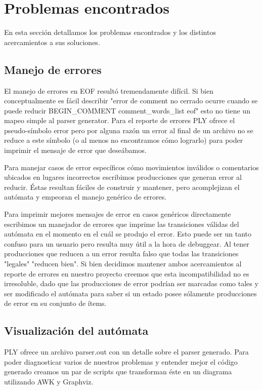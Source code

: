 \section{Problemas encontrados}
En esta sección detallamos los problemas encontrados y los distintos acercamientos a sus soluciones.

\subsection{Manejo de errores}
El manejo de errores en EOF resultó tremendamente difícil. Si bien conceptualmente es fácil describir "error de comment no cerrado ocurre cuando se puede reducir BEGIN\_COMMENT comment\_words\_list eof" esto no tiene un mapeo simple al parser generator. Para el reporte de errores PLY ofrece el pseudo-símbolo error pero por alguna razón un error al final de un archivo no se reduce a este símbolo (o al menos no encontramos cómo lograrlo) para poder imprimir el mensaje de error que deseábamos.

Para manejar casos de error específicos cómo movimientos inválidos o comentarios ubicados en lugares incorrectos escribimos producciones que generan error al reducir. Éstas resultan fáciles de construir y mantener, pero acomplejizan el autómata y empeoran el manejo genérico de errores.

Para imprimir mejores mensajes de error en casos genéricos directamente escribimos un manejador de errores que imprime las transiciones válidas del autómata en el momento en el cuál se produjo el error. Esto puede ser un tanto confuso para un usuario pero resulta muy útil a la hora de debuggear. Al tener producciones que reducen a un error resulta falso que todas las transiciones "legales" "reducen bien". Si bien decidimos mantener ambos acercamientos al reporte de errores en nuestro proyecto creemos que esta incompatibilidad no es irresoluble, dado que las producciones de error podrían ser marcadas como tales y ser modificado el autómata para saber si un estado posee sólamente producciones de error en su conjunto de ítems.

\subsection{Visualización del autómata}
PLY ofrece un archivo parser.out con un detalle sobre el parser generado. Para poder diagnosticar varios de nuestros problemas y entender mejor el código generado creamos un par de scripts que transforman éste en un diagrama utilizando AWK y Graphviz.